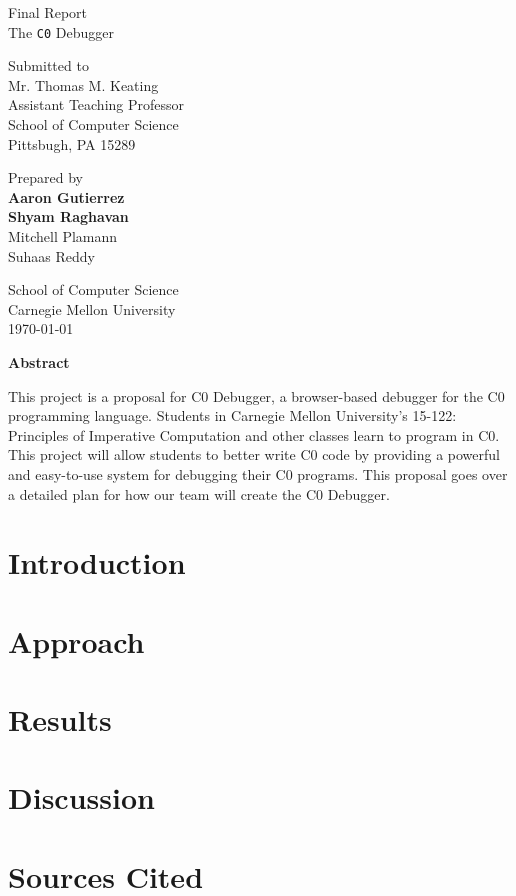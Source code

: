 \documentclass[11pt]{article}
\begin{document}
\setlength{\parindent}{2em}



\begin{titlepage}
\clearpage
\thispagestyle{empty}

\begin{center}
{\Huge Final Report}\\
\vspace{10 mm}
{\Huge The {\tt C0} Debugger}\\
\vspace{10 mm}

Submitted to\\
Mr. Thomas M. Keating\\
Assistant Teaching Professor\\
School of Computer Science\\
Pittsbugh, PA 15289

\vspace{10 mm}

Prepared by\\
{\bf Aaron Gutierrez}\\
{\bf Shyam Raghavan}\\
Mitchell Plamann\\
Suhaas Reddy

\vspace{10 mm}

School of Computer Science\\
Carnegie Mellon University\\
\today

\vspace{10 mm}

{\bf Abstract}
\end{center}
\par
This project is a proposal for C0 Debugger, a browser-based debugger for the
C0 programming language.
Students in Carnegie Mellon University's 15-122: Principles of Imperative
Computation and other classes learn to program in C0.
This project will allow students to better write C0 code by providing a
powerful and easy-to-use system for debugging their C0 programs.
This proposal goes over a detailed plan for how our team will create the C0 Debugger.
\end{titlepage}

\tableofcontents
\newpage


\section{Introduction}

\section{Approach}

\section{Results}

\section{Discussion}

\section{Sources Cited}
\end{document}
